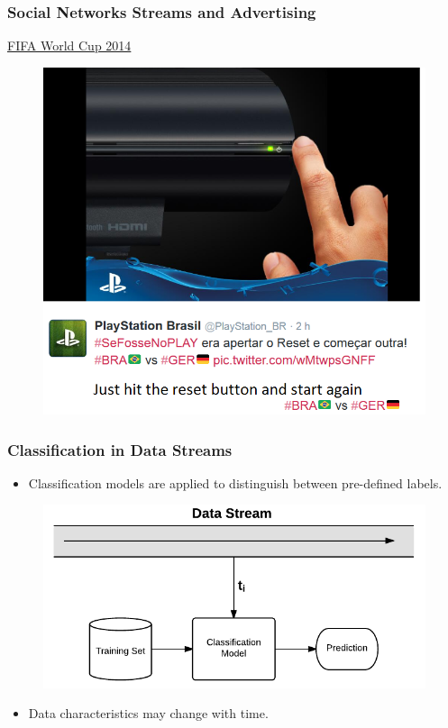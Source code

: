 \documentclass[14pt]{beamer}
\begin{document}
\begin{frame}\frametitle{Social Networks Streams and Advertising}

{\underline{FIFA World Cup 2014}}

\begin{figure}
\centering
\includegraphics[scale=0.65]{playstation}
\end{figure}

\end{frame}

\begin{frame}\frametitle{Classification in Data Streams}

\begin{itemize}
\item Classification models are applied to distinguish between pre-defined labels.
\end{itemize}

\vspace{-0.2in}
\begin{figure}
\centering
\includegraphics[scale=0.6]{Stream1}
\end{figure}
\vspace{-0.2in}
\pause
\begin{itemize}
\item \alert{Data characteristics may change with time}.
\end{itemize}
\end{frame}
\end{document}

